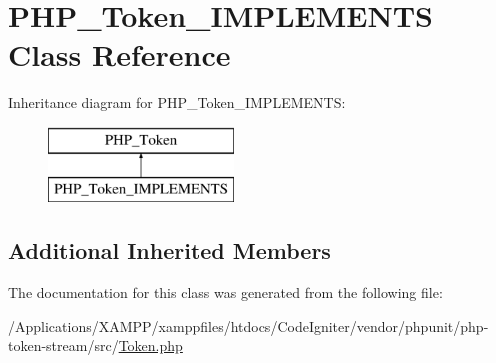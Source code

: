 \hypertarget{class_p_h_p___token___i_m_p_l_e_m_e_n_t_s}{}\section{P\+H\+P\+\_\+\+Token\+\_\+\+I\+M\+P\+L\+E\+M\+E\+N\+TS Class Reference}
\label{class_p_h_p___token___i_m_p_l_e_m_e_n_t_s}
Inheritance diagram for P\+H\+P\+\_\+\+Token\+\_\+\+I\+M\+P\+L\+E\+M\+E\+N\+TS\+:\begin{figure}[H]
\begin{center}
\leavevmode
\includegraphics[height=2.000000cm]{class_p_h_p___token___i_m_p_l_e_m_e_n_t_s}
\end{center}
\end{figure}
\subsection*{Additional Inherited Members}


The documentation for this class was generated from the following file\+:\begin{DoxyCompactItemize}
\item 
/\+Applications/\+X\+A\+M\+P\+P/xamppfiles/htdocs/\+Code\+Igniter/vendor/phpunit/php-\/token-\/stream/src/\mbox{\hyperlink{_token_8php}{Token.\+php}}\end{DoxyCompactItemize}
